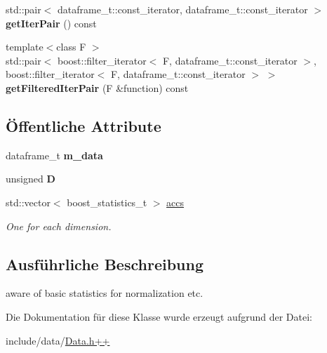 \begin{DoxyCompactItemize}
\item 
\hypertarget{classCDA_1_1EnhancedDataset_a7545c4c91dff1ccea71b02b5acdba507}{
std::pair$<$ dataframe\_\-t::const\_\-iterator, dataframe\_\-t::const\_\-iterator $>$ {\bfseries getIterPair} () const }
\label{classCDA_1_1EnhancedDataset_a7545c4c91dff1ccea71b02b5acdba507}

\item 
\hypertarget{classCDA_1_1EnhancedDataset_a52334e7e5f1fb68e0414a42cbb4a6d6d}{
{\footnotesize template$<$class F $>$ }\\std::pair$<$ boost::filter\_\-iterator$<$ F, dataframe\_\-t::const\_\-iterator $>$, boost::filter\_\-iterator$<$ F, dataframe\_\-t::const\_\-iterator $>$ $>$ {\bfseries getFilteredIterPair} (F \&function) const }
\label{classCDA_1_1EnhancedDataset_a52334e7e5f1fb68e0414a42cbb4a6d6d}

\end{DoxyCompactItemize}
\subsection*{Öffentliche Attribute}
\begin{DoxyCompactItemize}
\item 
\hypertarget{classCDA_1_1EnhancedDataset_a10e8496988b39465453b93894c1532d1}{
dataframe\_\-t {\bfseries m\_\-data}}
\label{classCDA_1_1EnhancedDataset_a10e8496988b39465453b93894c1532d1}

\item 
\hypertarget{classCDA_1_1EnhancedDataset_ae2e4868942ed33abf9d495b59525933b}{
unsigned {\bfseries D}}
\label{classCDA_1_1EnhancedDataset_ae2e4868942ed33abf9d495b59525933b}

\item 
\hypertarget{classCDA_1_1EnhancedDataset_a0a2a1d4c3eda234c49cc8192b5924045}{
std::vector$<$ boost\_\-statistics\_\-t $>$ \hyperlink{classCDA_1_1EnhancedDataset_a0a2a1d4c3eda234c49cc8192b5924045}{accs}}
\label{classCDA_1_1EnhancedDataset_a0a2a1d4c3eda234c49cc8192b5924045}

\begin{DoxyCompactList}\small\item\em One for each dimension. \item\end{DoxyCompactList}\end{DoxyCompactItemize}


\subsection{Ausführliche Beschreibung}
aware of basic statistics for normalization etc. 

Die Dokumentation für diese Klasse wurde erzeugt aufgrund der Datei:\begin{DoxyCompactItemize}
\item 
include/data/\hyperlink{Data_8h_09_09}{Data.h++}\end{DoxyCompactItemize}
